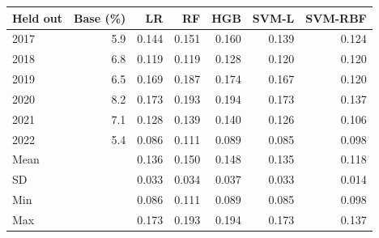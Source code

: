 \begin{tabular}{lrrrrrr}
\toprule
Held out & Base (\%) & LR & RF & HGB & SVM-L & SVM-RBF \\
\midrule
2017 & 5.9 & 0.144 & 0.151 & 0.160 & 0.139 & 0.124 \\
2018 & 6.8 & 0.119 & 0.119 & 0.128 & 0.120 & 0.120 \\
2019 & 6.5 & 0.169 & 0.187 & 0.174 & 0.167 & 0.120 \\
2020 & 8.2 & 0.173 & 0.193 & 0.194 & 0.173 & 0.137 \\
2021 & 7.1 & 0.128 & 0.139 & 0.140 & 0.126 & 0.106 \\
2022 & 5.4 & 0.086 & 0.111 & 0.089 & 0.085 & 0.098 \\
\midrule
Mean & & 0.136 & 0.150 & 0.148 & 0.135 & 0.118 \\
SD & & 0.033 & 0.034 & 0.037 & 0.033 & 0.014 \\
Min & & 0.086 & 0.111 & 0.089 & 0.085 & 0.098 \\
Max & & 0.173 & 0.193 & 0.194 & 0.173 & 0.137 \\
\bottomrule
\end{tabular}
